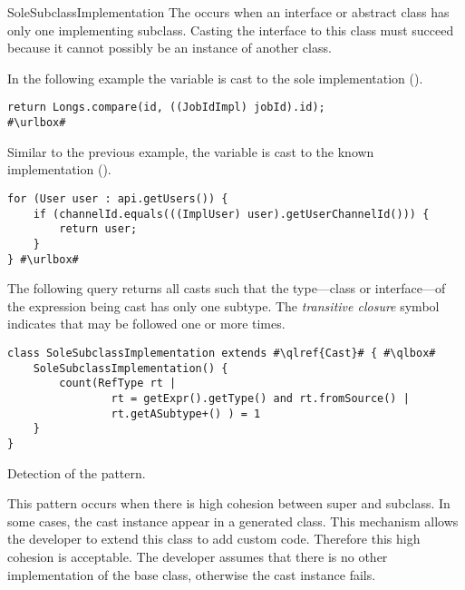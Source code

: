 \begin{pattern}{SoleSubclassImplementation}
The \thisp{} occurs when an interface or abstract class has only one implementing subclass.
Casting the interface to this class must succeed because it cannot possibly be an instance of another class.

\instances{}
In the following example the 
variable is cast to the sole implementation ().

\def\urlvar{http://bit.ly/ow2_proactive_scheduling_2Ulcjfs}
\begin{verbatim}
return Longs.compare(id, ((JobIdImpl) jobId).id);
#\urlbox#
\end{verbatim}

Similar to the previous example,
the variable  is cast to the known implementation ().

\def\urlvar{http://bit.ly/Javacord_Javacord_2GwGjuV}
\begin{verbatim}
for (User user : api.getUsers()) {
    if (channelId.equals(((ImplUser) user).getUserChannelId())) {
        return user;
    }
} #\urlbox#
\end{verbatim}


\detection{}
The following query returns all casts such that the type---class or interface---of the expression being cast has only one subtype.
The \emph{transitive closure} symbol \code{+} indicates that  may be followed one or more times.

\begin{listing}
\begin{verbatim}
class SoleSubclassImplementation extends #\qlref{Cast}# { #\qlbox#
	SoleSubclassImplementation() {
		count(RefType rt | 
				rt = getExpr().getType() and rt.fromSource() | 
				rt.getASubtype+() ) = 1
	}
}
\end{verbatim}
\caption{Detection of the \thisp{} pattern.}
\label{lst:ql:SoleSubclassImplementationCast}
\end{listing}


\issues{}
This pattern occurs when there is high cohesion between super and subclass.
In some cases, the cast instance appear in a generated class.
This mechanism allows the developer to extend this class to add custom code.
Therefore this high cohesion is acceptable.
The developer assumes that there is no other implementation of the base class,
otherwise the cast instance fails.

\end{pattern}
